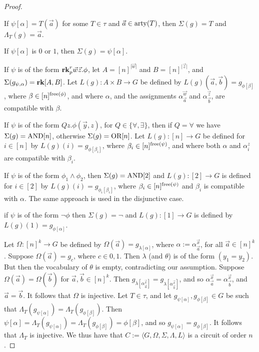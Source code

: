 \documentclass[../paper.tex]{subfiles}
\begin{document}
\begin{proof}
  \begin{myitemize}
  \item If $\psi[\alpha] = T(\vec{a})$ for some $T \in \tau$ and $\vec{a} \in
    \mathrm{arty}(T)$, then $\Sigma (g) = T$ and $\Lambda_T (g) = \vec{a}$.
  \item If $\psi[\alpha]$ is $0$ or $1$, then $\Sigma (g) = \psi[\alpha]$.
  \item If $\psi$ is of the form $\text{\textbf{rk}}^r_p \vec{w} \vec{z}. \phi$, let $A =
    [n]^{\vert \vec{w}\vert}$ and $B = [n]^{\vert \vec{z}\vert}$, and $\Sigma
    (g_{\psi, \alpha}) = \text{\textbf{rk}}[A, B]$. Let $L(g) : A \times B \rightarrow G$ be
    defined by $L(g)(\vec{a},\vec{b}) = g_{\phi[\beta]}$, where $\beta \in
    [n]^{\mathrm{free}(\phi)}$, and where $\alpha$, and the assignments
    $\alpha^{\vec{w}}_{\vec{a}}$ and $\alpha^{\vec{z}}_{\vec{b}}$, are
    compatible with $\beta$.
  \item If $\psi$ is of the form $Q z . \phi(\vec{y}, z)$, for $Q \in \{\forall,
    \exists\}$, then if $Q = \forall$ we have $\Sigma (g) = \text{\upshape AND}[n]$, otherwise
    $\Sigma (g) = \text{\upshape OR}[n]$. Let $L(g) : [n] \rightarrow G$ be defined for $i \in
    [n]$ by $L(g)(i) = g_{\phi[\beta_i]}$, where $\beta_i \in
    [n]^{\mathrm{free}(\psi)}$, and where both $\alpha$ and $\alpha^{z}_{i}$ are
    compatible with $\beta_i$.
  \item If $\psi$ is of the form $\phi_1 \land \phi_2$, then $\Sigma(g) =
    \text{\upshape AND}[2]$ and $L(g) : [2] \rightarrow G$ is defined for $i \in [2]$ by
    $L(g)(i) = g_{\phi_i[\beta_i]}$, where $\beta_i \in [n]^{\mathrm{free}(\psi)}$ and
    $\beta_i$ is compatible with $\alpha$. The same approach is used in the
    disjunctive case.
  \item if $\psi$ is of the form $\neg \phi$ then $\Sigma (g) = \neg$ and $L(g):
    [1] \rightarrow G$ is defined by $L(g)(1) = g_{\phi[\alpha]}$.
  \end{myitemize}

  Let $\Omega : [n]^k \rightarrow G$ be defined by $\Omega (\vec{a}) =
  g_{\lambda [\alpha]}$, where $\alpha := \alpha^{\vec{x}}_{\vec{a}}$, for all
  $\vec{a} \in [n]^k$. Suppose $\Omega (\vec{a}) = g_c$, where $ c \in {0,1}$.
  Then $\lambda$ (and $\theta$) is of the form $(y_1 = y_2)$. But then the
  vocabulary of $\theta$ is empty, contradicting our assumption. Suppose $\Omega
  (\vec{a}) = \Omega(\vec{b})$ for $\vec{a}, \vec{b} \in [n]^k$. Then
  $g_{\lambda[\alpha^{\vec{x}}_{\vec{a}}]} =
  g_{\lambda[\alpha^{\vec{x}}_{\vec{b}}]}$, and so $\alpha^{\vec{x}}_{\vec{a}} =
  \alpha^{\vec{x}}_{\vec{b}}$, and $\vec{a} = \vec{b}$. It follows that $\Omega$
  is injective. Let $T \in \tau$, and let $g_{\psi[\alpha]}, g_{\phi[\beta]} \in
  G$ be such that $\Lambda_T (g_{\psi[\alpha]}) = \Lambda_T (g_{\phi[\beta]})$.
  Then $\psi[\alpha] = \Lambda_T (g_{\psi[\alpha]}) = \Lambda_T
  (g_{\phi[\beta]}) = \phi[\beta]$, and so $g_{\psi[\alpha]} = g_{\phi[\beta]}$.
  It follows that $\Lambda_T$ is injective. We thus have that $C := \langle G,
  \Omega, \Sigma, \Lambda, L \rangle$ is a circuit of order $n$.


\end{proof}
\end{document}
